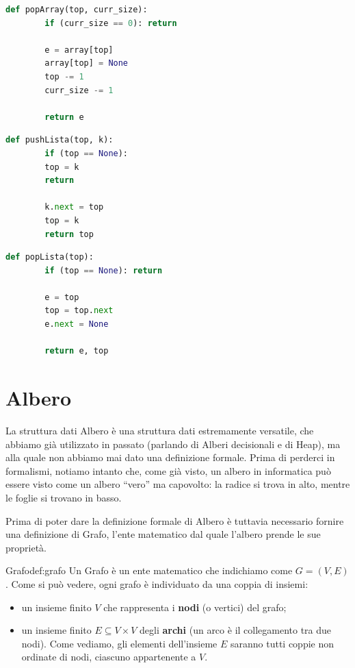 \documentclass[12pt]{report}
\begin{document}
    \begin{lstlisting}[language=Python, caption={Implementazione del Pop tramite Array}]
    	def popArray(top, curr_size):
    	if (curr_size == 0): return
    	
    	e = array[top]
    	array[top] = None
    	top -= 1
    	curr_size -= 1
    	
    	return e
    \end{lstlisting}
    
    \begin{lstlisting}[language=Python, caption={Implementazione del Push tramite Lista concatenata}]
    	def pushLista(top, k):
    	if (top == None):
    	top = k
    	return
    	
    	k.next = top
    	top = k
    	return top
    \end{lstlisting}
    
    \begin{lstlisting}[language=Python, caption={Implementazione del Pop tramite Lista concatenata}]
    	def popLista(top):
    	if (top == None): return
    	
    	e = top
    	top = top.next
    	e.next = None
    	
    	return e, top
    \end{lstlisting}
    
    \section{Albero}
    La struttura dati Albero è una struttura dati estremamente versatile, che abbiamo già utilizzato in passato (parlando di Alberi decisionali e di Heap), ma alla quale non abbiamo mai dato una definizione formale.
    Prima di perderci in formalismi, notiamo intanto che, come già visto, un albero in informatica può essere visto come un albero ``vero'' ma capovolto: la radice si trova in alto, mentre le foglie si trovano in basso.
    
    Prima di poter dare la definizione formale di Albero è tuttavia necessario fornire una definizione di Grafo, l'ente matematico dal quale l'albero prende le sue proprietà.
    
    \begin{definizione}{Grafo}{def:grafo}
    	Un Grafo è un ente matematico che indichiamo come $G = (V, E)$. Come si può vedere, ogni grafo è individuato da una coppia di insiemi:
    	\begin{itemize}
    		\item un insieme finito $V$ che rappresenta i \textbf{nodi} (o vertici) del grafo;
    		\item un insieme finito $E \subseteq V \times V$ degli \textbf{archi} (un arco è il collegamento tra due nodi). Come vediamo, gli elementi dell'insieme $E$ saranno tutti coppie non ordinate di nodi, ciascuno appartenente a $V$.
    	\end{itemize}
    \end{definizione}
    
\end{document}
